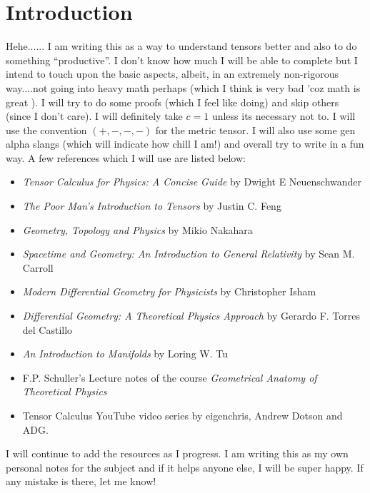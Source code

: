 \section{Introduction}
Hehe...... I am writing this as a way to understand tensors better and also to do something ``productive''. I don't know how much I will be able to complete but I intend to touch upon the basic aspects, albeit, in an extremely non-rigorous way....not going into heavy math perhaps (which I think is very bad 'coz math is great ). I will try to do some proofs (which I feel like doing) and skip others (since I don't care). I will definitely take $c=1$ unless its necessary not to. I will use the convention $(+,-,-,-)$ for the metric tensor. I will also use some gen alpha slangs (which will indicate how chill I am!) and overall try to write in a fun way. A few references which I will use are listed below:
\begin{itemize}
    \item \textit{Tensor Calculus for Physics: A Concise Guide
} by Dwight E Neuenschwander
\item \textit{The Poor Man’s Introduction to Tensors} by Justin C. Feng
\item \textit{Geometry, Topology and Physics} by Mikio Nakahara
\item \textit{Spacetime and Geometry: An Introduction to General Relativity} by Sean M. Carroll
\item \textit{Modern Differential Geometry for Physicists} by Christopher Isham
\item \textit{Differential Geometry: A Theoretical Physics Approach} by Gerardo F. Torres del Castillo
\item \textit{An Introduction to Manifolds} by Loring W. Tu
\item F.P. Schuller's Lecture notes of the course \textit{Geometrical Anatomy of Theoretical Physics}
\item Tensor Calculus YouTube video series by eigenchris, Andrew Dotson and ADG. 
\end{itemize}
I will continue to add the resources as I progress. I am writing this as my own personal notes for the subject and if it helps anyone else, I will be super happy. If any mistake is there, let me know! 